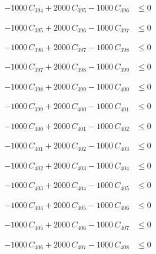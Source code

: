 \documentclass[a4paper,11pt]{article}
\begin{document}
\begin{align}
-1000\,C_{394} + 2000\,C_{395} - 1000\,C_{396} &\leq 0 \nonumber
\end{align}

\begin{align}
-1000\,C_{395} + 2000\,C_{396} - 1000\,C_{397} &\leq 0 \nonumber
\end{align}

\begin{align}
-1000\,C_{396} + 2000\,C_{397} - 1000\,C_{398} &\leq 0 \nonumber
\end{align}

\begin{align}
-1000\,C_{397} + 2000\,C_{398} - 1000\,C_{399} &\leq 0 \nonumber
\end{align}

\begin{align}
-1000\,C_{398} + 2000\,C_{399} - 1000\,C_{400} &\leq 0 \nonumber
\end{align}

\begin{align}
-1000\,C_{399} + 2000\,C_{400} - 1000\,C_{401} &\leq 0 \nonumber
\end{align}

\begin{align}
-1000\,C_{400} + 2000\,C_{401} - 1000\,C_{402} &\leq 0 \nonumber
\end{align}

\begin{align}
-1000\,C_{401} + 2000\,C_{402} - 1000\,C_{403} &\leq 0 \nonumber
\end{align}

\begin{align}
-1000\,C_{402} + 2000\,C_{403} - 1000\,C_{404} &\leq 0 \nonumber
\end{align}

\begin{align}
-1000\,C_{403} + 2000\,C_{404} - 1000\,C_{405} &\leq 0 \nonumber
\end{align}

\begin{align}
-1000\,C_{404} + 2000\,C_{405} - 1000\,C_{406} &\leq 0 \nonumber
\end{align}

\begin{align}
-1000\,C_{405} + 2000\,C_{406} - 1000\,C_{407} &\leq 0 \nonumber
\end{align}

\begin{align}
-1000\,C_{406} + 2000\,C_{407} - 1000\,C_{408} &\leq 0 \nonumber
\end{align}
\end{document}
